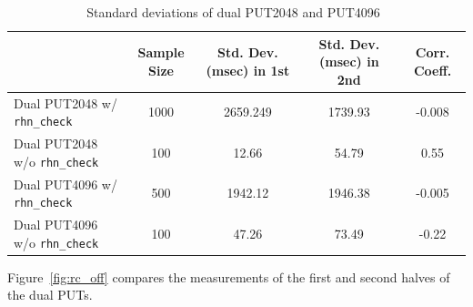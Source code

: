 \documentclass[10pt]{article}
\begin{document}
\begin{table}[h]
\centering
{
 \begin{tabular}{|l|c|c|c|c|} \hline
  														& Sample Size & Std. Dev. (msec) in 1st & Std. Dev. (msec) in 2nd & Corr. Coeff.\\ \hline
Dual PUT2048 w/ {\tt rhn\_check} &  1000 & 2659.249 & 1739.93 &  -0.008\\ \hline
Dual PUT2048 w/o {\tt rhn\_check} &  100  & 12.66 & 54.79 & 0.55 \\ \hline
Dual PUT4096 w/ {\tt rhn\_check} &  500  & 1942.12 & 1946.38 & -0.005\\ \hline
Dual PUT4096 w/o {\tt rhn\_check} &  100  & 47.26 &  73.49 & -0.22\\ \hline
  \end{tabular}
  }
 \caption{Standard deviations of dual PUT2048 and PUT4096~\label{tab:rhn_effect_comp}}
\end{table}

Figure~\ref{fig:rc_off} compares the measurements of the first and second halves of the dual PUTs.
\end{document}
